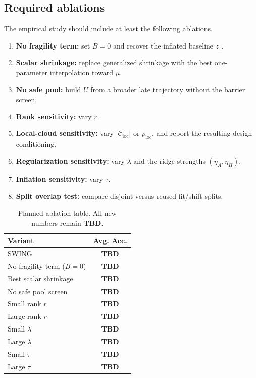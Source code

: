 \documentclass{article}
\newcommand{\cC}{\mathcal{C}}
\newcommand{\TBD}{\textbf{TBD}}
\newcommand{\swing}{\textup{\textsc{SWING}}}
\begin{document}
\subsection{Required ablations}

The empirical study should include at least the following ablations.
\begin{enumerate}[leftmargin=1.4em]
    \item \textbf{No fragility term:} set \(B=0\) and recover the inflated baseline \(z_\tau\).
    \item \textbf{Scalar shrinkage:} replace generalized shrinkage with the best one-parameter interpolation toward \(\mu\).
    \item \textbf{No safe pool:} build \(U\) from a broader late trajectory without the barrier screen.
    \item \textbf{Rank sensitivity:} vary \(r\).
    \item \textbf{Local-cloud sensitivity:} vary \(|\cC_{\mathrm{loc}}|\) or \(\rho_{\mathrm{loc}}\), and report the resulting design conditioning.
    \item \textbf{Regularization sensitivity:} vary \(\lambda\) and the ridge strengths \((\eta_A,\eta_H)\).
    \item \textbf{Inflation sensitivity:} vary \(\tau\).
    \item \textbf{Split overlap test:} compare disjoint versus reused fit/shift splits.
\end{enumerate}

\begin{table}[t]
    \centering
    \small
    \begin{tabular}{lc}
        \toprule
        Variant & Avg. Acc. \\
        \midrule
        \swing{} & \TBD{} \\
        No fragility term (\(B=0\)) & \TBD{} \\
        Best scalar shrinkage & \TBD{} \\
        No safe pool screen & \TBD{} \\
        Small rank \(r\) & \TBD{} \\
        Large rank \(r\) & \TBD{} \\
        Small \(\lambda\) & \TBD{} \\
        Large \(\lambda\) & \TBD{} \\
        Small \(\tau\) & \TBD{} \\
        Large \(\tau\) & \TBD{} \\
        \bottomrule
    \end{tabular}
    \caption{Planned ablation table. All new numbers remain \TBD{}.}
    \label{tab:ablations_tbd}
\end{table}
\end{document}
